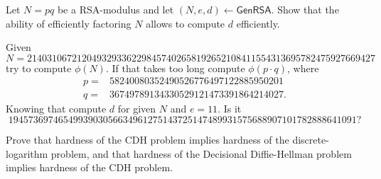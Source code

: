 \documentclass[a4paper,10pt,landscape,twocolumn]{scrartcl}
\begin{document}
\begin{exercise}[RSA]
Let $N=pq$ be a RSA-modulus and let
  $(N,e,d) \leftarrow \mathsf{GenRSA}$. 
Show that the ability of efficiently factoring $N$ allows to compute $d$
  efficiently.
  
  Given 
  \begin{equation}
  N=2140310672120493293362298457402658192652108411554313695782475927669427
  \end{equation}
  try to compute $\phi(N)$. If that takes too long compute $\phi(p\cdot q)$, where 
  \begin{align}
  p=&58240080352490526776497122885950201\\
  q=&36749789134330529121473391864214027.
  \end{align}
  Knowing that compute $d$ for given $N$ and $e=11$. Is it 
  \begin{equation}
  1945736974654993903056634961275143725147489931575688907101782888641091 ?
  \end{equation}
\end{exercise}


\begin{bonusexercise}
Prove that hardness of the CDH problem implies hardness of the discrete-logarithm problem, and that hardness of the Decisional Diffie-Hellman problem implies hardness of the CDH problem.
\end{bonusexercise}
\end{document}
